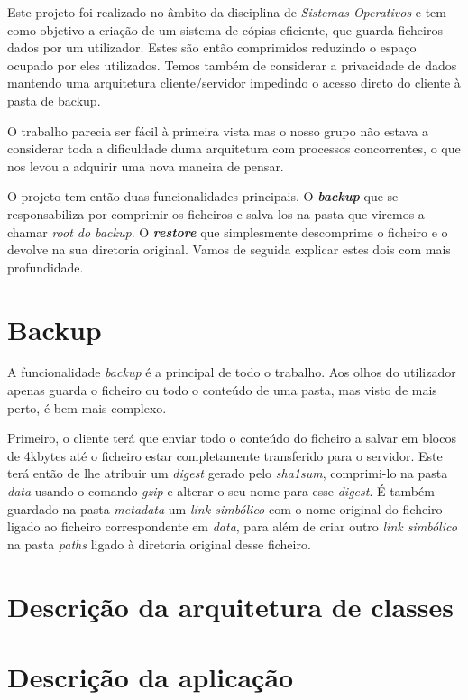 \documentclass[12pt,a4paper]{report}
\begin{document}
Este projeto foi realizado no âmbito da disciplina de \emph{Sistemas Operativos} e tem como objetivo a criação de um sistema de cópias eficiente, que guarda ficheiros dados por um utilizador. Estes são então comprimidos reduzindo o espaço ocupado por eles utilizados. Temos também de considerar a privacidade de dados mantendo uma arquitetura cliente/servidor impedindo o acesso direto do cliente à pasta de backup.\par
O trabalho parecia ser fácil à primeira vista mas o nosso grupo não estava a considerar toda a dificuldade duma arquitetura com processos concorrentes, o que nos levou a adquirir uma nova maneira de pensar.\par
O projeto tem então duas funcionalidades principais. O \emph{\bfseries{backup}} que se responsabiliza por comprimir os ficheiros e salva-los na pasta que viremos a chamar \emph{root do backup}. O \emph{\bfseries{restore}} que simplesmente descomprime o ficheiro e o devolve na sua diretoria original. Vamos de seguida explicar estes dois com mais profundidade.


\chapter{Backup}
A funcionalidade \emph{backup} é a principal de todo o trabalho. Aos olhos do utilizador apenas guarda o ficheiro ou todo o conteúdo de uma pasta, mas visto de mais perto, é bem mais complexo.\par Primeiro, o cliente terá que enviar todo o conteúdo do ficheiro a salvar em blocos de 4kbytes até o ficheiro estar completamente transferido para o servidor. Este terá então de lhe atribuir um \emph{digest} gerado pelo \emph{sha1sum}, comprimi-lo na pasta \emph{data}  usando o comando \emph{gzip} e alterar o seu nome para esse \emph{digest}. É também guardado na pasta \emph{metadata} um \emph{link simbólico} com o nome original do ficheiro ligado ao ficheiro correspondente em \emph{data}, para além de criar outro \emph{link simbólico} na pasta \emph{paths} ligado à diretoria original desse ficheiro.

\chapter{Descrição da arquitetura de classes}

\chapter{Descrição da aplicação}
\end{document}
